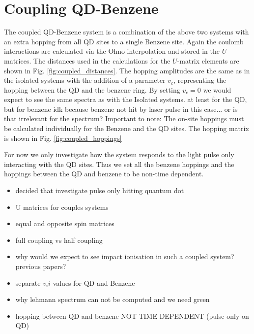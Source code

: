 \section{Coupling QD-Benzene}
\color{blue}
    The coupled QD-Benzene system is a combination of the above two systems with an extra hopping from all QD sites to a single Benzene site. Again the coulomb interactions are calculated via the Ohno interpolation and stored in the $U$ matrices. The distances used in the calculations for the $U$-matrix elements are shown in Fig. \ref{fig:coupled_distances}. The hopping amplitudes are the same as in the isolated systems with the addition of a parameter $v_c$, representing the hopping between the QD and the benzene ring. By setting $v_c = 0$ we would expect to see the same spectra as with the Isolated systems.{\color{red} at least for the QD, but for benzene idk because benzene not hit by laser pulse in this case... or is that irrelevant for the spectrum?}  Important to note: The on-site hoppings must be calculated individually for the Benzene and the QD sites. The hopping matrix is shown in Fig. \ref{fig:coupled_hoppings}
    \medskip
    
    For now we only investigate how the system responds to the light pulse only interacting with the QD sites. Thus we set all the benzene hoppings and the hoppings between the QD and benzene to be non-time dependent.
\color{black}

\begin{itemize}
    \item decided that investigate pulse only hitting quantum dot
    \item U matrices for couples systems
    \item equal and opposite spin matrices
    \item full coupling vs half coupling
    \item {\color{red} why would we expect to see impact ionisation in such a coupled system? previous papers?}
    \item separate $v_ii$ values for QD and Benzene
    \item why lehmann spectrum can not be computed and we need green
    \item hopping between QD and benzene NOT TIME DEPENDENT (pulse only on QD)
\end{itemize}

\usetikzlibrary{matrix, positioning}

\newcommand{\my}{|[fill=myellow]|}
\renewcommand{\mg}{|[fill=mgreen]|}



